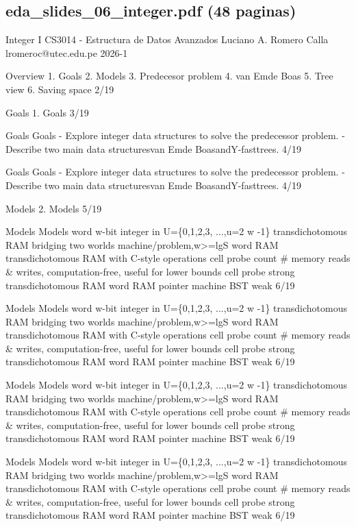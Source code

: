 \subsection*{eda\_slides\_06\_integer.pdf (48 paginas)}
\begin{description}[leftmargin=!,labelwidth=4.2em,style=nextline]
\item[Pag. 1] Integer I CS3014 - Estructura de Datos Avanzados Luciano A. Romero Calla lromeroc@utec.edu.pe 2026-1
\item[Pag. 2] Overview 1. Goals 2. Models 3. Predecesor problem 4. van Emde Boas 5. Tree view 6. Saving space 2/19
\item[Pag. 3] Goals 1. Goals 3/19
\item[Pag. 4] Goals Goals - Explore integer data structures to solve the predecessor problem. - Describe two main data structuresvan Emde BoasandY-fasttrees. 4/19
\item[Pag. 5] Goals Goals - Explore integer data structures to solve the predecessor problem. - Describe two main data structuresvan Emde BoasandY-fasttrees. 4/19
\item[Pag. 6] Models 2. Models 5/19
\item[Pag. 7] Models Models word w-bit integer in U=\{0,1,2,3, ...,u=2 w -1\} transdichotomous RAM bridging two worlds machine/problem,w>=lgS word RAM transdichotomous RAM with C-style operations cell probe count \# memory reads \& writes, computation-free, useful for lower bounds cell probe strong transdichotomous RAM word RAM pointer machine BST weak 6/19
\item[Pag. 8] Models Models word w-bit integer in U=\{0,1,2,3, ...,u=2 w -1\} transdichotomous RAM bridging two worlds machine/problem,w>=lgS word RAM transdichotomous RAM with C-style operations cell probe count \# memory reads \& writes, computation-free, useful for lower bounds cell probe strong transdichotomous RAM word RAM pointer machine BST weak 6/19
\item[Pag. 9] Models Models word w-bit integer in U=\{0,1,2,3, ...,u=2 w -1\} transdichotomous RAM bridging two worlds machine/problem,w>=lgS word RAM transdichotomous RAM with C-style operations cell probe count \# memory reads \& writes, computation-free, useful for lower bounds cell probe strong transdichotomous RAM word RAM pointer machine BST weak 6/19
\item[Pag. 10] Models Models word w-bit integer in U=\{0,1,2,3, ...,u=2 w -1\} transdichotomous RAM bridging two worlds machine/problem,w>=lgS word RAM transdichotomous RAM with C-style operations cell probe count \# memory reads \& writes, computation-free, useful for lower bounds cell probe strong transdichotomous RAM word RAM pointer machine BST weak 6/19

\end{description}
